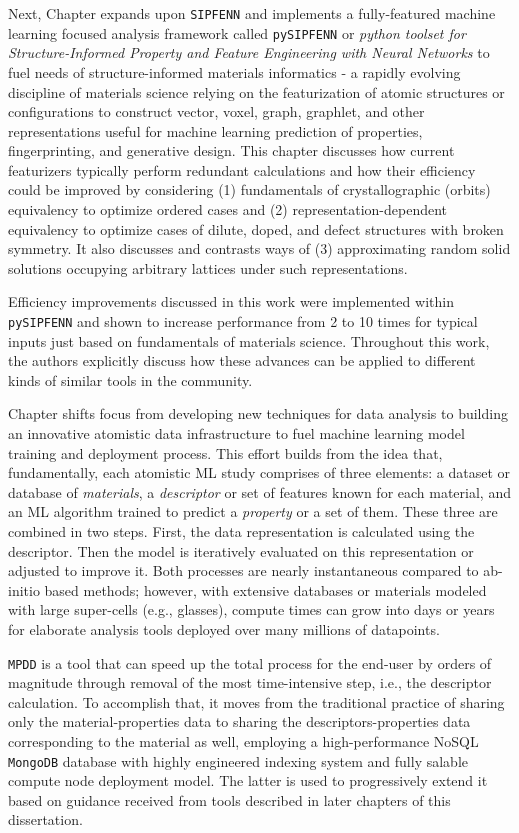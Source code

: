 Next, Chapter  expands upon \texttt{SIPFENN} and implements a fully-featured machine learning focused analysis framework called \texttt{pySIPFENN} or \textit{python toolset for Structure-Informed Property and Feature Engineering with Neural Networks} to fuel needs of structure-informed materials informatics - a rapidly evolving discipline of materials science relying on the featurization of atomic structures or configurations to construct vector, voxel, graph, graphlet, and other representations useful for machine learning prediction of properties, fingerprinting, and generative design. This chapter discusses how current featurizers typically perform redundant calculations and how their efficiency could be improved by considering (1) fundamentals of crystallographic (orbits) equivalency to optimize ordered cases and (2) representation-dependent equivalency to optimize cases of dilute, doped, and defect structures with broken symmetry. It also discusses and contrasts ways of (3) approximating random solid solutions occupying arbitrary lattices under such representations.

Efficiency improvements discussed in this work were implemented within \texttt{pySIPFENN} and shown to increase performance from 2 to 10 times for typical inputs just based on fundamentals of materials science. Throughout this work, the authors explicitly discuss how these advances can be applied to different kinds of similar tools in the community.


Chapter  shifts focus from developing new techniques for data analysis to building an innovative atomistic data infrastructure to fuel machine learning model training and deployment process. This effort builds from the idea that, fundamentally, each atomistic ML study comprises of three elements: a dataset or database of \emph{materials}, a \emph{descriptor} or set of features known for each material, and an ML algorithm trained to predict a \emph{property} or a set of them. These three are combined in two steps. First, the data representation is calculated using the descriptor. Then the model is iteratively evaluated on this representation or adjusted to improve it. Both processes are nearly instantaneous compared to ab-initio based methods; however, with extensive databases or materials modeled with large super-cells (e.g., glasses), compute times can grow into days or years for elaborate analysis tools deployed over many millions of datapoints. 

\texttt{MPDD} is a tool that can speed up the total process for the end-user by orders of magnitude through removal of the most time-intensive step, i.e., the descriptor calculation. To accomplish that, it moves from the traditional practice of sharing only the material-properties data to sharing the descriptors-properties data corresponding to the material as well, employing a high-performance NoSQL \texttt{MongoDB} database with highly engineered indexing system and fully salable compute node deployment model. The latter is used to progressively extend it based on guidance received from tools described in later chapters of this dissertation.

